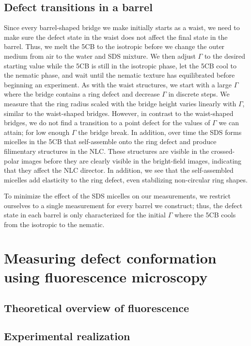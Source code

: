 \subsection{Defect transitions in a barrel}
Since every barrel-shaped bridge we make initially starts as a waist, we need to make sure the defect state in the waist does not affect the final state in the barrel.
Thus, we melt the 5CB to the isotropic before we change the outer medium from air to the water and SDS mixture.
We then adjust $\Gamma$ to the desired starting value while the 5CB is still in the isotropic phase, let the 5CB cool to the nematic phase, and wait until the nematic texture has equilibrated before beginning an experiment.
As with the waist structures, we start with a large $\Gamma$ where the bridge contains a ring defect and decrease $\Gamma$ in discrete steps.
We measure that the ring radius scaled with the bridge height varies linearly with $\Gamma$, similar to the waist-shaped bridges.
However, in contrast to the waist-shaped bridges, we do not find a transition to a point defect for the values of $\Gamma$ we can attain; for low enough $\Gamma$ the bridge break.
In addition, over time the SDS forms micelles in the 5CB that self-assemble onto the ring defect and produce filimentary structures in the NLC.
These structures are visible in the crossed-polar images before they are clearly visible in the bright-field images, indicating that they affect the NLC director.
In addition, we see that the self-assembled micelles add elasticity to the ring defect, even stabilizing non-circular ring shapes.

To minimize the effect of the SDS micelles on our measurements, we restrict ourselves to a single measurement for every barrel we construct; thus, the defect state in each barrel is only characterized for the initial $\Gamma$ where the 5CB cools from the isotropic to the nematic.




\section{Measuring defect conformation using fluorescence microscopy}
\subsection{Theoretical overview of fluorescence}
\subsection{Experimental realization}
